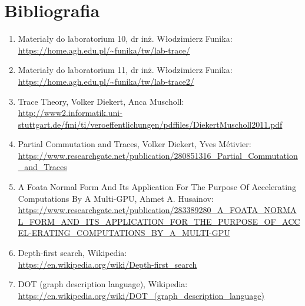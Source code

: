 \documentclass[11pt]{article}
\begin{document}
    \hypertarget{bibliografia}{%
\section{Bibliografia}\label{bibliografia}}

\begin{enumerate}
\def\labelenumi{\arabic{enumi}.}
\item
  Materiały do laboratorium 10, dr inż. Włodzimierz Funika:\\
  \url{https://home.agh.edu.pl/~funika/tw/lab-trace/}
\item
  Materiały do laboratorium 11, dr inż. Włodzimierz Funika:\\
  \url{https://home.agh.edu.pl/~funika/tw/lab-trace2/}
\item
  Trace Theory, Volker Diekert, Anca Muscholl:\\
  \url{http://www2.informatik.uni-stuttgart.de/fmi/ti/veroeffentlichungen/pdffiles/DiekertMuscholl2011.pdf}
\item
  Partial Commutation and Traces, Volker Diekert, Yves Métivier:\\
  \url{https://www.researchgate.net/publication/280851316_Partial_Commutation_and_Traces}
\item
  A Foata Normal Form And Its Application For The Purpose Of
  Accel­erating Computations By A Multi-GPU, Ahmet A. Husainov:\\
  \url{https://www.researchgate.net/publication/283389280_A_FOATA_NORMAL_FORM_AND_ITS_APPLICATION_FOR_THE_PURPOSE_OF_ACCEL-ERATING_COMPUTATIONS_BY_A_MULTI-GPU}
\item
  Depth-first search, Wikipedia:\\
  \url{https://en.wikipedia.org/wiki/Depth-first_search}
\item
  DOT (graph description language), Wikipedia:\\
  \url{https://en.wikipedia.org/wiki/DOT_(graph_description_language)}
\end{enumerate}


    
    
    
\end{document}
